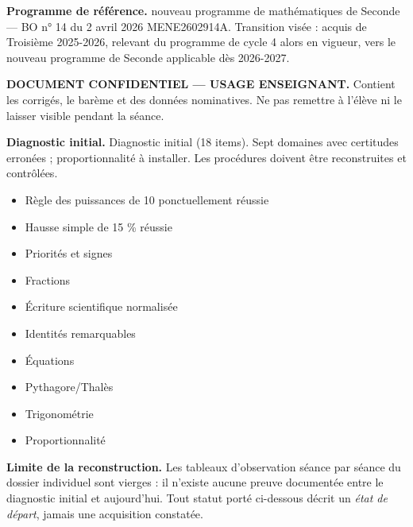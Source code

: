 \documentclass[10pt,a4paper]{article}
\begin{document}
\begin{methodbox}\small\textbf{Programme de référence.} nouveau programme de mathématiques de Seconde --- BO n° 14 du 2 avril 2026 MENE2602914A. Transition visée : acquis de Troisième 2025-2026, relevant du programme de cycle 4 alors en vigueur, vers le nouveau programme de Seconde applicable dès 2026-2027.\end{methodbox}
\begin{keybox}\textbf{DOCUMENT CONFIDENTIEL --- USAGE ENSEIGNANT.} Contient les corrigés, le barème et des données nominatives. Ne pas remettre à l'élève ni le laisser visible pendant la séance.\end{keybox}
\begin{methodbox}
\textbf{Diagnostic initial.} Diagnostic initial (18 items). Sept domaines avec certitudes erronées ; proportionnalité à installer. Les procédures doivent être reconstruites et contrôlées.
\end{methodbox}
\begin{itemize}\item Règle des puissances de 10 ponctuellement réussie\item Hausse simple de 15 \% réussie\end{itemize}
\begin{itemize}\item Priorités et signes\item Fractions\item Écriture scientifique normalisée\item Identités remarquables\item Équations\item Pythagore/Thalès\item Trigonométrie\item Proportionnalité\end{itemize}
\begin{warningbox}\textbf{Limite de la reconstruction.} Les tableaux d'observation séance par séance du dossier individuel sont vierges : il n'existe aucune preuve documentée entre le diagnostic initial et aujourd'hui. Tout statut porté ci-dessous décrit un \emph{état de départ}, jamais une acquisition constatée.\end{warningbox}
\end{document}
